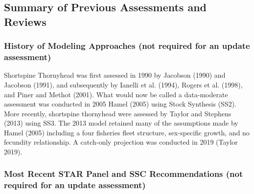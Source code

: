 \documentclass[11pt,
  english,
  letterpaper,
]{article}
\begin{document}
\hypertarget{summary-of-previous-assessments-and-reviews}{%
\subsection{Summary of Previous Assessments and Reviews}\label{summary-of-previous-assessments-and-reviews}}

\hypertarget{history-of-modeling-approaches-not-required-for-an-update-assessment}{%
\subsubsection{History of Modeling Approaches (not required for an update assessment)}\label{history-of-modeling-approaches-not-required-for-an-update-assessment}}

Shortspine Thornyhead was first assessed in 1990 by Jacobson (1990) and Jacobson (1991), and subsequently by Ianelli et al. (1994), Rogers et al. (1998), and Piner and Methot (2001). What would now be called a data-moderate assessment was conducted in 2005 Hamel (2005) using Stock Synthesis (SS2). More recently, shortspine thornyhead were assessed by Taylor and Stephens (2013) using SS3. The 2013 model retained many of the assumptions made by Hamel (2005) including a four fisheries fleet structure, sex-specific growth, and no fecundity relationship. A catch-only projection was conducted in 2019 (Taylor 2019).

\hypertarget{most-recent-star-panel-and-ssc-recommendations-not-required-for-an-update-assessment}{%
\subsubsection{Most Recent STAR Panel and SSC Recommendations (not required for an update assessment)}\label{most-recent-star-panel-and-ssc-recommendations-not-required-for-an-update-assessment}}
\end{document}
